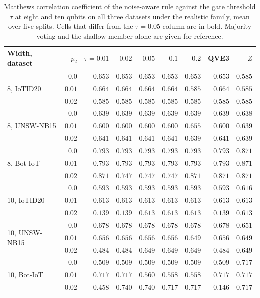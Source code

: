 \begin{table}[t]
\centering
\caption{Matthews correlation coefficient of the noise-aware rule against the gate threshold
$\tau$ at eight and ten qubits on all three datasets under the realistic
family, mean over five splits. Cells
that differ from the $\tau = 0.05$ column are in bold. Majority voting and the shallow
member alone are given for reference.}
\label{tab:tauwidth}
\footnotesize
\begin{tabular}{@{}lrrrrrrrr@{}}
\toprule
Width, dataset & $p_2$ & $\tau = 0.01$ & $0.02$ & $0.05$ & $0.1$ & $0.2$ & QVE3 & $Z$ \\
\midrule
\multirow{3}{*}{8, IoTID20}
 & $0.0$ & $0.653$ & $0.653$ & $0.653$ & $0.653$ & $0.653$ & $0.653$ & $0.585$ \\
 & $0.01$ & $0.664$ & $0.664$ & $0.664$ & $0.664$ & $\mathbf{0.585}$ & $0.664$ & $0.585$ \\
 & $0.02$ & $0.585$ & $0.585$ & $0.585$ & $0.585$ & $0.585$ & $0.585$ & $0.585$ \\
\midrule
\multirow{3}{*}{8, UNSW-NB15}
 & $0.0$ & $0.639$ & $0.639$ & $0.639$ & $0.639$ & $0.639$ & $0.639$ & $0.638$ \\
 & $0.01$ & $0.600$ & $0.600$ & $0.600$ & $0.600$ & $\mathbf{0.655}$ & $0.600$ & $0.639$ \\
 & $0.02$ & $0.641$ & $0.641$ & $0.641$ & $0.641$ & $\mathbf{0.639}$ & $0.641$ & $0.639$ \\
\midrule
\multirow{3}{*}{8, Bot-IoT}
 & $0.0$ & $0.793$ & $0.793$ & $0.793$ & $0.793$ & $0.793$ & $0.793$ & $0.871$ \\
 & $0.01$ & $0.793$ & $0.793$ & $0.793$ & $0.793$ & $0.793$ & $0.793$ & $0.871$ \\
 & $0.02$ & $\mathbf{0.871}$ & $0.747$ & $0.747$ & $0.747$ & $\mathbf{0.871}$ & $0.871$ & $0.871$ \\
\midrule
\multirow{3}{*}{10, IoTID20}
 & $0.0$ & $0.593$ & $0.593$ & $0.593$ & $0.593$ & $0.593$ & $0.593$ & $0.616$ \\
 & $0.01$ & $0.613$ & $0.613$ & $0.613$ & $0.613$ & $0.613$ & $0.613$ & $0.613$ \\
 & $0.02$ & $\mathbf{0.139}$ & $\mathbf{0.139}$ & $0.613$ & $0.613$ & $0.613$ & $0.139$ & $0.613$ \\
\midrule
\multirow{3}{*}{10, UNSW-NB15}
 & $0.0$ & $0.678$ & $0.678$ & $0.678$ & $0.678$ & $0.678$ & $0.678$ & $0.651$ \\
 & $0.01$ & $0.656$ & $0.656$ & $0.656$ & $0.656$ & $\mathbf{0.649}$ & $0.656$ & $0.649$ \\
 & $0.02$ & $\mathbf{0.484}$ & $\mathbf{0.484}$ & $0.649$ & $0.649$ & $0.649$ & $0.484$ & $0.649$ \\
\midrule
\multirow{3}{*}{10, Bot-IoT}
 & $0.0$ & $0.509$ & $0.509$ & $0.509$ & $0.509$ & $0.509$ & $0.509$ & $0.717$ \\
 & $0.01$ & $\mathbf{0.717}$ & $\mathbf{0.717}$ & $0.560$ & $\mathbf{0.558}$ & $\mathbf{0.558}$ & $0.717$ & $0.717$ \\
 & $0.02$ & $\mathbf{0.458}$ & $0.740$ & $0.740$ & $\mathbf{0.717}$ & $\mathbf{0.717}$ & $0.146$ & $0.717$ \\
\bottomrule
\end{tabular}
\end{table}
